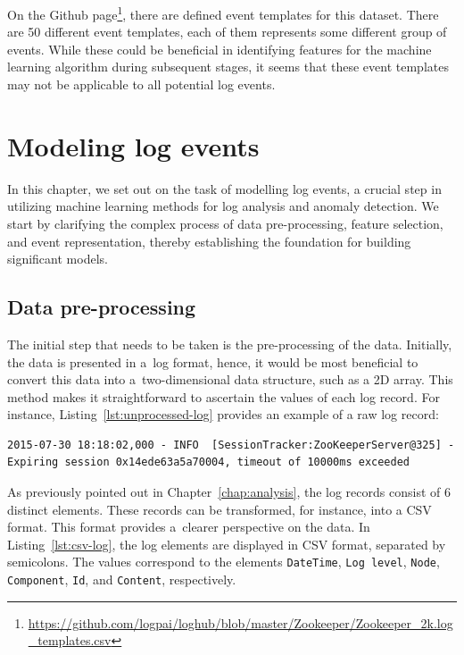 On the Github page\footnote{\url{https://github.com/logpai/loghub/blob/master/Zookeeper/Zookeeper_2k.log_templates.csv}}, there are defined event templates for this dataset. There are 50 different event templates, each of them represents some different group of events. While these could be beneficial in identifying features for the machine learning algorithm during subsequent stages, it seems that these event templates may not be applicable to all potential log events.

\chapter{Modeling log events}
\label{chap:modeling}
In this chapter, we set out on the task of modelling log events, a crucial step in utilizing machine learning methods for log analysis and anomaly detection. We start by clarifying the complex process of data pre-processing, feature selection, and event representation, thereby establishing the foundation for building significant models.

\section{Data pre-processing}
\label{sec:data-preprocess}
The initial step that needs to be taken is the pre-processing of the data. Initially, the data is presented in a~log format, hence, it would be most beneficial to convert this data into a~two-dimensional data structure, such as a 2D array. This method makes it straightforward to ascertain the values of each log record. For instance, Listing~\ref{lst:unprocessed-log} provides an example of a raw log record:

\begin{lstlisting}
2015-07-30 18:18:02,000 - INFO  [SessionTracker:ZooKeeperServer@325] -
Expiring session 0x14ede63a5a70004, timeout of 10000ms exceeded
\end{lstlisting}

As previously pointed out in Chapter~\ref{chap:analysis}, the log records consist of 6 distinct elements. These records can be transformed, for instance, into a CSV format. This format provides a~clearer perspective on the data. In Listing~\ref{lst:csv-log}, the log elements are displayed in CSV format, separated by semicolons. The values correspond to the elements \texttt{DateTime}, 	\texttt{Log level}, \texttt{Node}, \texttt{Component}, 	\texttt{Id}, and \texttt{Content}, respectively.

